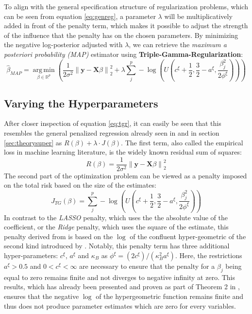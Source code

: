 \documentclass[12pt,a4paper]{article}
\newcommand{\norm}[1]{\left\lVert#1\right\rVert}
\DeclareMathOperator*{\argmin}{arg\,min}
\begin{document}
To align with the general specification structure of regularization problems, which can be seen from equation \ref{eq:genreg}, a parameter $\lambda$ will be multiplicatively added in front of the penalty term, which makes it possible to adjust the strength of the influence that the penalty has on the chosen parameters. By minimizing the negative log-posterior adjusted with $\lambda$, we can retrieve the \textit{maximum a posteriori probability (MAP)} estimator using \textbf{Triple-Gamma-Regularization}:
\begin{equation}\label{eq:tgr}
\hat{\beta}_{MAP} = \underset{\beta \in \mathbb{R}^p}{\argmin} \left(\frac{1}{2\sigma^2}\norm{\mathbf{y} - \mathbf{X}\beta}_2^2 + \lambda \sum_j^p -\log\left(U\left(c^\xi + \frac{1}{2}, \frac{3}{2}-a^\xi, \frac{\beta_j^2}{2\phi^\xi}\right)\right)\right) 
\end{equation}

\newpage
\subsection{Varying the Hyperparameters}
After closer inspection of equation \ref{eq:tgr}, it can easily be seen that this resembles the general penalized regression already seen in \textcite[398]{ESL2009} and in section \ref{sec:theorysuper} as $R(\beta) + \lambda\cdot J(\beta)$. The first term, also called the empirical loss in machine learning literature, is the widely known residual sum of squares:
\[
R(\beta)=\frac{1}{2\sigma^2}\norm{\mathbf{y} - \mathbf{X}\beta}_2^2
\] 
The second part of the optimization problem can be viewed as a penalty imposed on the total risk based on the size of the estimates:
\[
J_{TG}(\beta) = \sum_j^p -\log\left(U\left(c^\xi + \frac{1}{2}, \frac{3}{2}-a^\xi, \frac{\beta_j^2}{2\phi^\xi}\right)\right)
\]
In contrast to the \textit{LASSO} penalty, which uses the the absolute value of the coefficient, or the \textit{Ridge} penalty, which uses the square of the estimate, this penalty derived from \textcite{TGP2020} is based on the $\log$ of the confluent hyper-geometric of the second kind introduced by \textcite{Tricomi1947}. Notably, this penalty term has three additional hyper-parameters: $c^\xi$, $a^\xi$ and $\kappa_B$ as $\phi^\xi = (2c^\xi)/(\kappa^2_B a^\xi)$. Here, the restrictions $a^\xi>0.5$ and $0 < c^\xi < \infty$ are necessary to ensure that the penalty for a $\beta_j$ being equal to zero remains finite and not diverges to negative infinity at zero. This results, which has already been presented and proven as part of Theorem 2 in \textcite[5--6]{TGP2020}, ensures that the negative $\log$ of the hypergeometric function remains finite and thus does not produce parameter estimates which are zero for every variables.\\
\end{document}
